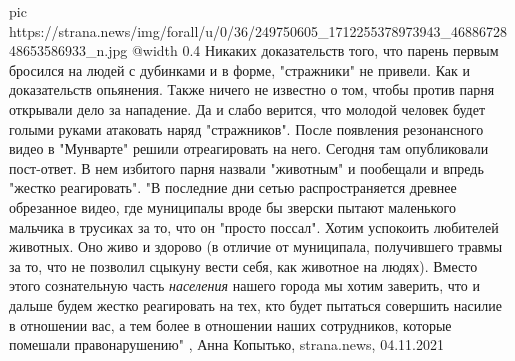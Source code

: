 \ifcmt
  pic https://strana.news/img/forall/u/0/36/249750605_1712255378973943_4688672848653586933_n.jpg
  @width 0.4
\fi
Никаких доказательств того, что парень первым бросился на людей с дубинками и в
форме, "стражники" не привели. Как и доказательств опьянения. Также ничего не
известно о том, чтобы против парня открывали дело за нападение.  Да и слабо
верится, что молодой человек будет голыми руками атаковать наряд "стражников".
После появления резонансного видео в "Мунварте" решили отреагировать на него.
Сегодня там опубликовали пост-ответ. В нем избитого парня назвали "животным" и
пообещали и впредь "жестко реагировать".  "В последние дни сетью
распространяется древнее обрезанное видео, где муниципалы вроде бы зверски
пытают маленького мальчика в трусиках за то, что он "просто поссал".  Хотим
успокоить любителей животных. Оно живо и здорово (в отличие от муниципала,
получившего травмы за то, что не позволил сцыкуну вести себя, как животное на
людях).  Вместо этого сознательную часть \emph{населения} нашего города мы
хотим заверить, что и дальше будем жестко реагировать на тех, кто будет
пытаться совершить насилие в отношении вас, а тем более в отношении наших
сотрудников, которые помешали правонарушению"
, 
Анна Копытько, strana.news, 04.11.2021

